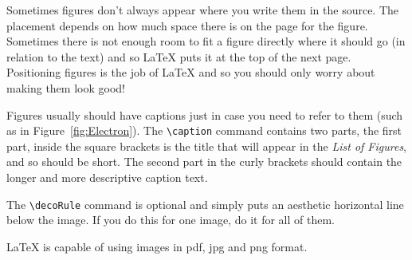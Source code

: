 Sometimes figures don't always appear where you write them in the source. The placement depends on how much space there is on the page for the figure. Sometimes there is not enough room to fit a figure directly where it should go (in relation to the text) and so \LaTeX{} puts it at the top of the next page. Positioning figures is the job of \LaTeX{} and so you should only worry about making them look good!

Figures usually should have captions just in case you need to refer to them (such as in Figure~\ref{fig:Electron}). The \verb|\caption| command contains two parts, the first part, inside the square brackets is the title that will appear in the \emph{List of Figures}, and so should be short. The second part in the curly brackets should contain the longer and more descriptive caption text.

The \verb|\decoRule| command is optional and simply puts an aesthetic horizontal line below the image. If you do this for one image, do it for all of them.

\LaTeX{} is capable of using images in pdf, jpg and png format.

